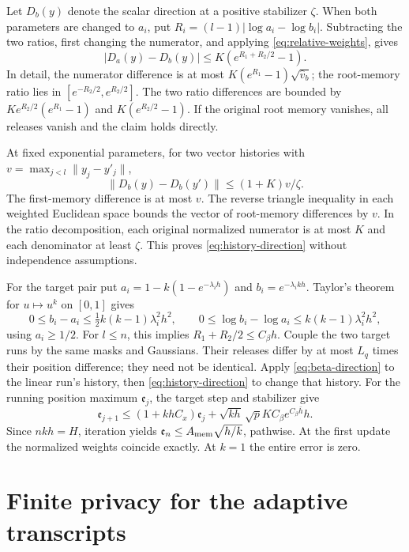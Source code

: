 \documentclass[a4paper,11pt]{article}
\theoremstyle{remark}
\newcommand{\norm}[1]{\lVert#1\rVert}
\begin{document}
Let $D_b(y)$ denote the scalar direction at a positive stabilizer $\zeta$.
When both parameters are changed to $a_i$, put
$R_i=(l-1)|\log a_i-\log b_i|$. Subtracting the two ratios, first
changing the numerator, and applying \eqref{eq:relative-weights}, gives
\begin{equation}\label{eq:beta-direction}
 |D_a(y)-D_b(y)|\le K(e^{R_1+R_2/2}-1).
\end{equation}
In detail, the numerator difference is at most
$K(e^{R_1}-1)\sqrt{\widehat v_b}$; the root-memory ratio lies in
$[e^{-R_2/2},e^{R_2/2}]$. The two ratio differences are bounded by
$Ke^{R_2/2}(e^{R_1}-1)$ and $K(e^{R_2/2}-1)$. If the original root
memory vanishes, all releases vanish and the claim holds directly.

At fixed exponential parameters, for two vector histories with
$v=\max_{j<l}\norm{y_j-y'_j}$,
\begin{equation}\label{eq:history-direction}
 \norm{D_b(y)-D_b(y')}\le(1+K)v/\zeta.
\end{equation}
The first-memory difference is at most $v$. The reverse triangle
inequality in each weighted Euclidean space bounds the vector of root-memory
differences by $v$. In the ratio decomposition, each original normalized
numerator is at most $K$ and each denominator at least $\zeta$.
This proves \eqref{eq:history-direction} without independence assumptions.

For the target pair put $a_i=1-k(1-e^{-\lambda_i h})$ and
$b_i=e^{-\lambda_i kh}$. Taylor's theorem for $u\mapsto u^k$ on $[0,1]$
gives
\[
 0\le b_i-a_i\le\tfrac12k(k-1)\lambda_i^2h^2,
 \qquad 0\le\log b_i-\log a_i\le k(k-1)\lambda_i^2h^2,
\]
using $a_i\ge1/2$. For $l\le n$, this implies
$R_1+R_2/2\le C_\beta h$.
Couple the two target runs by the same masks and Gaussians. Their releases
differ by at most $L_q$ times their position difference; they need not be
identical. Apply \eqref{eq:beta-direction} to the linear run's history,
then \eqref{eq:history-direction} to change that history. For the running
position maximum $\mathfrak e_j$, the target step and stabilizer give
\[
 \mathfrak e_{j+1}\le(1+khC_x)\mathfrak e_j
       +\sqrt{kh}\,\sqrt p K C_\beta e^{C_\beta\bar h}h.
\]
Since $nkh=H$, iteration yields
$\mathfrak e_n\le A_{\rm mem}\sqrt{h/k}$, pathwise. At the first update the
normalized weights coincide exactly. At $k=1$ the entire error is zero.

\section{Finite privacy for the adaptive transcripts}\label{app:privacy}
\end{document}
